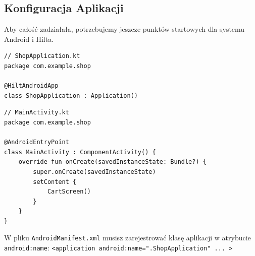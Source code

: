 \subsection{Konfiguracja Aplikacji}

Aby całość zadziałała, potrzebujemy jeszcze punktów startowych dla systemu Android i Hilta.

\begin{verbatim}
// ShopApplication.kt
package com.example.shop

@HiltAndroidApp
class ShopApplication : Application()
\end{verbatim}

\begin{verbatim}
// MainActivity.kt
package com.example.shop

@AndroidEntryPoint
class MainActivity : ComponentActivity() {
    override fun onCreate(savedInstanceState: Bundle?) {
        super.onCreate(savedInstanceState)
        setContent {
            CartScreen()
        }
    }
}
\end{verbatim}

W pliku \texttt{AndroidManifest.xml} musisz zarejestrować klasę aplikacji w atrybucie \texttt{android:name}:
\texttt{<application android:name=".ShopApplication" ... >}